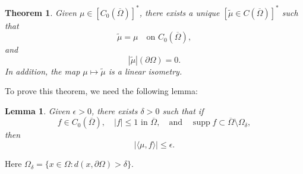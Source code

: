 \documentclass[a4paper, 11pt]{report}
\newtheorem{thm}{Theorem}[chapter]
\newtheorem{lmm}{Lemma}[chapter]
\theoremstyle{definition}\newtheorem*{rmk}{Remark}
\DeclareMathOperator{\supp}{supp}
\begin{document}
\begin{thm}\label{meathm}
Given $\mu\in [C_0(\overline{\Omega})]^*$, there exists a unique $[\tilde{\mu} \in C(\overline{\Omega})]^*$ such that
\begin{equation}\label{2333}
\tilde{\mu} = \mu \quad \text{on } C_0(\overline{\Omega}),
\end{equation}
and
\begin{equation}\label{2334}
|\tilde{\mu}|(\partial \Omega) = 0.
\end{equation}
In addition, the map $\mu \mapsto \tilde{\mu}$ is a linear isometry.
\end{thm}

To prove this theorem, we need the following lemma:
\begin{lmm}\label{mealmm}
Given $\epsilon > 0$, there exists $\delta > 0 $ such that if
\[
f \in C_0(\overline{\Omega}),\quad |f| \le 1 \text{ in } \overline{\Omega},\quad\text{and}\quad\supp f \subset \overline{\Omega}\setminus \Omega_{\delta},
\]
then
\[
|\langle \mu ,f \rangle |\le \epsilon.
\]
\end{lmm}

Here $\Omega_{\delta} = \{ x\in \Omega : d(x,\partial \Omega) > \delta\}$.
\end{document}
